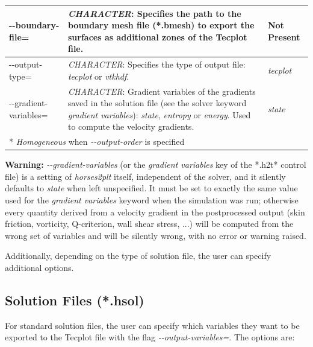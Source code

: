 \documentclass[a4paper,10pt]{report}
\begin{document}
\begin{longtable}{|p{4cm}|p{10cm}|p{2.2cm}|}
-{}-boundary-file= 	&
			\textit{CHARACTER}: Specifies the path to the boundary mesh file (*.bmesh) to export the surfaces as additional zones of the Tecplot file. &
							Not Present  \\ \hline

-{}-output-type= 	&
            \textit{CHARACTER}: Specifies the type of output file: \textit{tecplot} or \textit{vtkhdf}. &
                            \textit{tecplot}  \\ \hline

-{}-gradient-variables= 	&
            \textit{CHARACTER}: Gradient variables of the gradients saved in the solution file (see the solver keyword \textit{gradient variables}): \textit{state}, \textit{entropy} or \textit{energy}. Used to compute the velocity gradients. &
                            \textit{state}  \\ \hline
\multicolumn{3}{p{16.4cm}}{*  \textit{Homogeneous} when \textit{-{}-output-order} is specified} \\

\end{longtable}

\textbf{Warning:} \textit{-{}-gradient-variables} (or the \textit{gradient variables} key of the *.h2t* control file) is a setting of \textit{horses2plt} itself, independent of the solver, and it silently defaults to \textit{state} when left unspecified. It must be set to exactly the same value used for the \textit{gradient variables} keyword when the simulation was run; otherwise every quantity derived from a velocity gradient in the postprocessed output (skin friction, vorticity, Q-criterion, wall shear stress, ...) will be computed from the wrong set of variables and will be silently wrong, with no error or warning raised.

Additionally, depending on the type of solution file, the user can specify additional options.

\subsection{Solution Files (*.hsol)} \label{PostProc:hsol}

For standard solution files, the user can specify which variables they want to be exported to the Tecplot file with the flag \textit{-{}-output-variables=}.
The options are:
\end{document}
